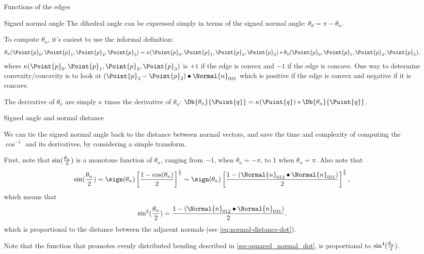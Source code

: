 \begin{plSection}{Functions of the edges}
\begin{plSection}{Signed normal angle}
The dihedral angle can be expressed simply in terms of the
signed normal angle: $\theta_d = \pi - \theta_n$.

To compute $\theta_n$,
it's easiest to use the informal definition:
\begin{equation}
\theta_n(\Point{p}_0,\Point{p}_1,\Point{p}_2,\Point{p}_3)
= \kappa(\Point{p}_0,\Point{p}_1,\Point{p}_2,\Point{p}_3) \ast \theta_u(\Point{p}_0,\Point{p}_1,\Point{p}_2,\Point{p}_3),
\end{equation}
where $\kappa(\Point{p}_0,\Point{p}_1,\Point{p}_2,\Point{p}_3)$ is
$+1$ if the edge is convex
and
$-1$ if the edge is concave.
One way to determine convexity/concavity
is to look at
$\left(\Point{p}_3 - \Point{p}_2 \right) \bullet \Normal{n}_{031}$
which is positive if the edge is convex
and negative if it is concave.

The derivative of $\theta_n$ are simply $\kappa$
times the derivative of $\theta_u$:
$\Db{\theta_n}{\Point{q}} = \kappa(\Point{q}) \ast \Db{\theta_u}{\Point{q}}$.

\end{plSection}%

\begin{plSection}{Signed angle and normal distance}
\label{sec:Signed-angle-and-normal-distance}

We can tie the signed normal angle back 
to the distance between normal vectors,
and save the time and complexity
of computing the $\cos^{-1}$ and its derivatives,
by considering a simple transform.

First, note that $\sin({\theta_n \over 2})$
is a monotone function of $\theta_n$,
ranging from $-1$, when $\theta_n = -\pi$,
to $1$ when $\theta_n = \pi$.
Also note that 
\begin{equation}
\sin({\theta_n \over 2}) 
 = 
\sign(\theta_n) 
\left[ {1 - \cos(\theta_n)} 
\over 2 \right]^{1 \over 2}
 = 
\sign(\theta_n) 
\left[ {1 - \left( \Normal{n}_{012}\bullet\Normal{n}_{031} \right)} 
\over 2 \right]^{1 \over 2},
\end{equation}
which means that
\begin{equation}
\sin^2({\theta_n \over 2}) 
= {{1 - \left( \Normal{n}_{012}\bullet\Normal{n}_{031} \right)} \over 2},
\end{equation}
which is proportional to the distance between the adjacent normals
(see \cref{eq:normal-distance-dot}).

Note that the function that promotes evenly 
distributed bending described in \autoref{sec:squared_normal_dot},
is proportional to $\sin^4({\theta_n \over 2})$. 


\end{plSection}
\end{plSection}
